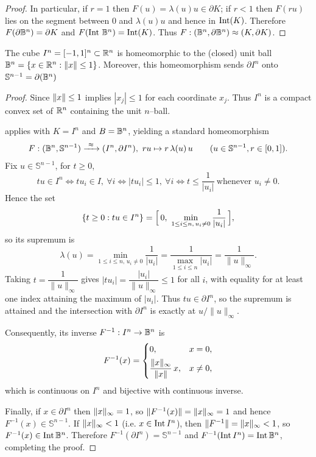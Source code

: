 \begin{proof}
    In particular, if $r=1$ then $F(u)=\lambda(u)u\in\partial K$; if $r<1$ then $F(r u)$ lies on the
    segment between $0$ and $\lambda(u)u$ and hence in $\operatorname{Int}(K)$.
    Therefore $F(\partial\mathbb{B}^n)=\partial K$ and $F(\operatorname{Int}\,\mathbb{B}^n)=\operatorname{Int}(K)$. Thus $F:(\mathbb{B}^n,\partial\mathbb{B}^n)\approx (K,\partial K)$.
\end{proof}

\begin{corollary}\label{cor:cube-ball}
    The cube \(I^n=[-1,1]^n\subset\mathbb{R}^n\) is homeomorphic to the (closed) unit ball
\(\mathbb{B}^n=\{x\in\mathbb{R}^n:\|x\|\le 1\}\). Moreover, this homeomorphism sends
\(\partial I^n\) onto \(\mathbb{S}^{n-1}=\partial(\mathbb{B}^n)\)
\end{corollary}
\begin{proof}
    Since $\lVert x\rVert \leq 1$ implies $|x_j|\le 1$ for each coordinate $x_j$. Thus $I^n$ is a compact convex set of $\mathbb{R}^n$ containing the unit $n$–ball. 
    
     applies with $K=I^n$ and $B=\mathbb{B}^n$, yielding a standard homeomorphism
    \[
        F:(\B^n,\mathbb{S}^{n-1})\xrightarrow{\ \approx\ }(I^n,\partial I^n),~
        ru \mapsto r\,\lambda(u)\,u 
        \qquad (u \in \mathbb{S}^{n-1}, r \in [0,1]).
    \]
Fix $u\in\mathbb{S}^{n-1}$, for $t\ge 0$,
\[
tu\in I^n 
\iff t u_i \in I,~\forall i
\iff |t u_i|\le 1,~\forall i
\iff t\le \dfrac{1}{|u_i|}\ \text{whenever }u_i\neq 0.
\]
Hence the set 
\[\{t\ge 0: tu\in I^n\}=
\Bigl[\,0,\ \min_{1\le i\le n,\,u_i\neq 0}\dfrac{1}{|u_i|}\,\Bigr],
\]
so its supremum is
\[
\lambda(u)=\min_{1\le i\le n,\,u_i\neq 0}\dfrac{1}{|u_i|}
=\dfrac{1}{\max_{1\le i\le n}|u_i|}
=\dfrac{1}{\|u\|_\infty}.
\]
Taking $t=\dfrac{1}{\|u\|_\infty}$ gives 
$|t u_i|=\dfrac{|u_i|}{\|u\|_\infty}\le 1$ for all $i$, with equality for at least one index attaining the maximum of $|u_i|$. Thus $tu\in\partial I^n$, so the supremum is attained and the intersection with $\partial I^n$ is exactly at $u/\|u\|_\infty$.

Consequently, its inverse \(F^{-1}:I^n\to\mathbb{B}^n\) is
\[
F^{-1}(x)=
\begin{cases}
0, & x=0,\\[4pt]
\dfrac{\lVert x\rVert_\infty}{\lVert x\rVert}\,x, & x\neq 0,
\end{cases}
\]
which is continuous on \(I^n\) and bijective with continuous inverse.

Finally, if \(x\in\partial I^n\) then \(\lVert x\rVert_\infty=1\), so
\(\|F^{-1}(x)\|=\lVert x\rVert_\infty=1\) and hence \(F^{-1}(x)\in\mathbb{S}^{n-1}\).  
If \(\lVert x\rVert_\infty<1\) (i.e. \(x\in \operatorname{Int} I^n\)), then
\(\|F^{-1}\|=\lVert x\rVert_\infty<1\), so \(F^{-1}(x)\in \operatorname{Int}\mathbb{B}^n\).
Therefore \(F^{-1}(\partial I^n)=\mathbb{S}^{n-1}\) and
\(F^{-1}(\operatorname{Int} I^n)=\operatorname{Int}\mathbb{B}^n\), completing the proof.
\end{proof}

